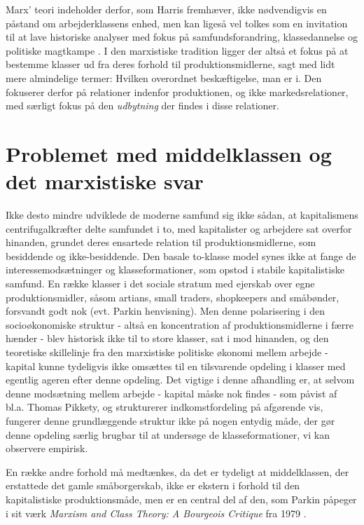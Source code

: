 Marx' teori indeholder derfor, som Harris fremhæver, ikke nødvendigvis en påstand om arbejderklassens enhed, men kan ligeså vel tolkes som en invitation til at lave historiske analyser med fokus på samfundsforandring, klassedannelse og politiske magtkampe \parencite[28]{Harrits2014}. I den marxistiske tradition ligger der altså et fokus på at bestemme klasser ud fra deres forhold til produktionsmidlerne, sagt med lidt mere almindelige termer: Hvilken overordnet beskæftigelse, man er i. Den fokuserer derfor på relationer indenfor produktionen, og ikke markedsrelationer, med særligt fokus på den \emph{udbytning} der findes i disse relationer.


\section{Problemet med middelklassen og det marxistiske svar \label{2_nymarxisme}}

Ikke desto mindre udviklede de moderne samfund sig ikke sådan, at kapitalismens centrifugalkræfter delte samfundet i to, med kapitalister og arbejdere sat overfor hinanden, grundet deres ensartede relation til produktionsmidlerne, som besiddende og ikke-besiddende. Den basale to-klasse model synes ikke at fange de interessemodsætninger og klasseformationer, som opstod i stabile kapitalistiske samfund. En række klasser i det sociale stratum med ejerskab over egne produktionsmidler, såsom artians, small traders, shopkeepers and småbønder, %
forsvandt godt nok (evt. Parkin henvisning). Men denne polarisering i den socioøkonomiske struktur - altså en koncentration af produktionsmidlerne i færre hænder - blev historisk ikke til to store klasser, sat i mod hinanden, og den teoretiske skillelinje fra den marxistiske politiske økonomi mellem arbejde - kapital kunne tydeligvis ikke omsættes til en tilsvarende opdeling i klasser med egentlig ageren efter denne opdeling. Det vigtige i denne afhandling er, at selvom denne modsætning mellem arbejde - kapital måske nok findes - som påvist af bl.a. Thomas Pikkety, og strukturerer indkomstfordeling på afgørende vis, fungerer denne grundlæggende struktur ikke på nogen entydig måde, der gør denne opdeling særlig brugbar til at undersøge de klasseformationer, vi kan observere empirisk. 

En række andre forhold må medtænkes, da det er tydeligt at middelklassen, der erstattede det gamle småborgerskab, ikke er ekstern i forhold til den kapitalistiske produktionsmåde, men er en central del af den, som Parkin påpeger i sit værk \emph{Marxism and Class Theory: A Bourgeois Critique} fra 1979 \parencite[16]{Parkin1979}. %

